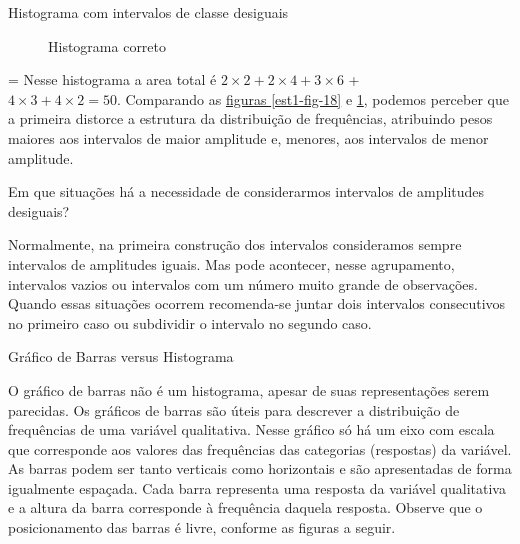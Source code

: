 {{\begin{example}{Histograma com intervalos de classe desiguais}
\begin{figure}[H]
\begin{tikzpicture}[scale=.4, every node/.style={scale=.75}]
\end{tikzpicture}
\caption{Histograma correto}
\label{est1-fig-19}\end{figure}
=
Nesse histograma a area total é $2 \times 2 + 2 \times 4 + 3\times 6$ +\\ $  4 \times 3 + 4 \times 2 = 50$. Comparando as \hyperref[est1-fig-18]{figuras \ref{est1-fig-18}} e \ref{est1-fig-19}, podemos perceber que a primeira distorce a estrutura da distribuição de frequências, atribuindo pesos maiores aos intervalos de maior amplitude e, menores, aos intervalos de menor amplitude.

Em que situações há a necessidade de considerarmos intervalos de amplitudes desiguais?

Normalmente, na primeira construção dos intervalos consideramos sempre intervalos de amplitudes iguais. Mas pode acontecer, nesse agrupamento, intervalos vazios ou intervalos com um número muito grande de observações. Quando essas situações ocorrem recomenda-se juntar dois intervalos consecutivos no primeiro caso ou subdividir o intervalo no segundo caso.

\end{example}

\begin{observation}{Gráfico de Barras versus Histograma}

O gráfico de barras não é um histograma, apesar de suas representações serem parecidas.  Os gráficos de barras são úteis para descrever a distribuição de frequências de uma variável qualitativa. Nesse gráfico só há um eixo com escala que corresponde aos valores das frequências das categorias (respostas) da variável. As barras podem ser tanto verticais como horizontais e são apresentadas de forma igualmente espaçada. Cada barra representa uma resposta da variável qualitativa e a altura da barra corresponde à frequência daquela resposta. Observe que o posicionamento das barras é livre, conforme as figuras a seguir.

\begin{figure}[H]
\centering
\capstart

\noindent

\begin{minipage}{0.4\textwidth}
\begin{figure}[H]
\capstart

\noindent
{}
\end{figure}
\end{minipage}
\end{figure}
\end{observation}}}
